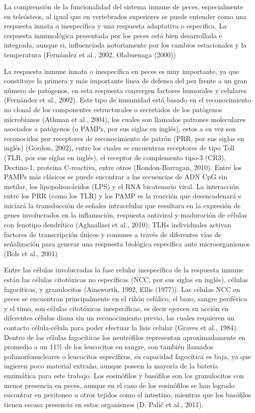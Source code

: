 \documentclass[11pt,a4paper,]{article}
\begin{document}
La comprensión de la funcionalidad del sistema inmune de peces,
especialmente en teleósteos, al igual que en vertebrados superiores se
puede entender como una respuesta innata o inespecífica y una respuesta
adaptativa o especifica. La respuesta inmunológica presentada por los
peces está bien desarrollada e integrada, aunque si, influenciada
notoriamente por los cambios estacionales y la temperatura (Fernández et
al., 2002, Olabuenaga (2000))

La respuesta inmune innata o inespecífica en peces es muy importante, ya
que constituye la primera y más importante línea de defensa del pez
frente a un gran número de patógenos, en esta respuesta convergen
factores humorales y celulares (Fernández et al., 2002). Este tipo de
inmunidad está basado en el reconocimiento no clonal de los componentes
estructurales o secretados de los patógenos microbianos (Athman et al.,
2004)⁠, los cuales son llamados patrones moleculares asociados a
patógenos (o PAMPs, por sus siglas en inglés), estos a su vez son
reconocidos por receptores de reconocimiento de patrón (PRR, por sus
siglas en inglés) (Gordon, 2002), entre los cuales se encuentran
receptores de tipo Toll (TLR, por sus siglas en inglés), el receptor de
complemento tipo-3 (CR3), Dectina-1, proteína C-reactiva, entre otros
(Rondon-Barragan, 2010). Entre los PAMPs más clásicos se puede encontrar
a las secuencias de ADN CpG sin metilar, los lipopolisacáridos (LPS) y
el RNA bicatenario viral. La interacción entre los PRR (como los TLR) y
los PAMP es la reacción que desencadenará e iniciará la transducción de
señales intracelular que resultara en la expresión de genes involucrados
en la inflamación, respuesta antiviral y maduración de células con
fenotipo dendrítico (Aghaallaei et al., 2010)⁠; TLRs individuales
activan factores de transcripción únicos y comunes a través de
diferentes vías de señalización para generar una respuesta biológica
especifica ante microorganismos (Bols et al., 2001)

Entre las células involucradas la fase celular inespecífica de la
respuesta inmune están las células citotóxicas no específicas (NCC, por
sus siglas en inglés), células fagocíticas, y granulocitos (Ainsworth,
1992, Ellis (1977)). Las células NCC en peces se encuentran
principalmente en el riñón cefálico, el bazo, sangre periférica y el
timo, son células citotóxicas inespecíficas, es decir ejercen su acción
en diferentes células diana sin un reconocimiento previo, las cuales
requieren un contacto célula-célula para poder efectuar la lisis celular
(Graves et al., 1984). Dentro de las células fagocíticas los neutrófilos
representan aproximadamente en promedio a un 11\% de los leucocitos en
sangre, son también llamados polimorfonucleares o leucocitos
específicos, su capacidad fagocítica es baja, ya que ingieren poco
material extraño, aunque poseen la mayoría de la batería enzimática para
este trabajo. Los eosinófilos y basófilos son los granulocitos con menor
presencia en peces, aunque en el caso de los eosinófilos se han logrado
encontrar en peritoneo u otros tejidos como el intestino, mientras que
los basófilos tienen escasa presencia en estos organismos (D. Palić et
al., 2011).
\end{document}
